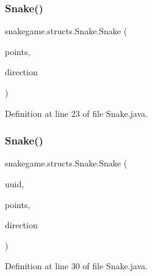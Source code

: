 \subsubsection{\texorpdfstring{Snake()}{Snake()}\hspace{0.1cm}{\footnotesize\ttfamily [1/3]}}
{\footnotesize\ttfamily snakegame.\+structs.\+Snake.\+Snake (\begin{DoxyParamCaption}\item[{Linked\+List$<$ \mbox{\hyperlink{classsnakegame_1_1structs_1_1_point}{Point}} $>$}]{points,  }\item[{\mbox{\hyperlink{enumsnakegame_1_1structs_1_1_direction}{Direction}}}]{direction }\end{DoxyParamCaption})}



Definition at line 23 of file Snake.\+java.

\mbox{\label{classsnakegame_1_1structs_1_1_snake_afae60310456b2ff1474879d2c80d75b1}} 
\subsubsection{\texorpdfstring{Snake()}{Snake()}\hspace{0.1cm}{\footnotesize\ttfamily [2/3]}}
{\footnotesize\ttfamily snakegame.\+structs.\+Snake.\+Snake (\begin{DoxyParamCaption}\item[{U\+U\+ID}]{uuid,  }\item[{Linked\+List$<$ \mbox{\hyperlink{classsnakegame_1_1structs_1_1_point}{Point}} $>$}]{points,  }\item[{\mbox{\hyperlink{enumsnakegame_1_1structs_1_1_direction}{Direction}}}]{direction }\end{DoxyParamCaption})}



Definition at line 30 of file Snake.\+java.

\mbox{\label{classsnakegame_1_1structs_1_1_snake_a4d2bf8212dfe91b17aed31f44203f37f}} 
